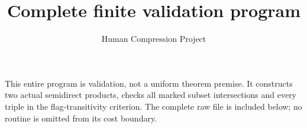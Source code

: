 
\title{Complete finite validation program}\author{Human Compression Project}\date{}
\maketitle
This entire program is validation, not a uniform theorem premise. It constructs two actual semidirect products, checks all marked subset intersections and every triple in the flag-transitivity criterion. The complete raw file is included below; no routine is omitted from its cost boundary.

